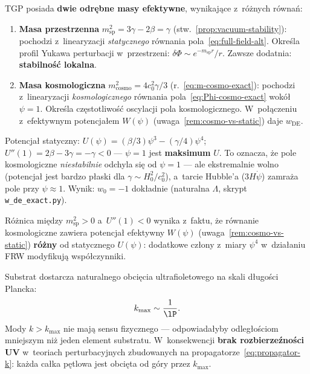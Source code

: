\begin{remark}\label{rem:two-masses}
TGP posiada \textbf{dwie odr\k{e}bne masy efektywne},
wynikaj\k{a}ce z~r\'o\.znych r\'owna\'n:

\begin{enumerate}[nosep]
  \item \textbf{Masa przestrzenna} $m_{\mathrm{sp}}^2 = 3\gamma - 2\beta = \gamma$
    (stw.~\ref{prop:vacuum-stability}): pochodzi z~linearyzacji
    \emph{statycznego} r\'ownania pola~\eqref{eq:full-field-alt}.
    Okre\'sla profil Yukawa perturbacji w~przestrzeni:
    $\delta\Phi \sim e^{-m_{\mathrm{sp}} r}/r$.
    Zawsze dodatnia: \textbf{stabilno\'s\'c lokalna}.

  \item \textbf{Masa kosmologiczna} $m_{\mathrm{cosmo}}^2 = 4c_0^2\gamma/3$
    (r.~\eqref{eq:m-cosmo-exact}): pochodzi z~linearyzacji
    \emph{kosmologicznego} r\'ownania pola~\eqref{eq:Phi-cosmo-exact}
    wok\'o\l{} $\psi = 1$. Okre\'sla cz\k{e}stotliwo\'s\'c
    oscylacji pola kosmologicznego. W~po\l{}\k{a}czeniu
    z~efektywnym potencja\l{}em $W(\psi)$
    (uwaga~\ref{rem:cosmo-vs-static}) daje $w_{\mathrm{DE}}$.
\end{enumerate}

\smallskip\noindent
Potencja\l{} statyczny: $U(\psi) = (\beta/3)\psi^3 - (\gamma/4)\psi^4$;
$U''(1) = 2\beta - 3\gamma = -\gamma < 0$ ---
$\psi = 1$ jest \textbf{maksimum} $U$.
To oznacza, \.ze pole kosmologiczne \emph{niestabilnie}
odchyla si\k{e} od $\psi = 1$ --- ale ekstremalnie wolno
(potencja\l{} jest bardzo p\l{}aski dla $\gamma \sim H_0^2/c_0^2$),
a~tarcie Hubble'a ($3H\dot\psi$) zamra\.za pole
przy $\psi \approx 1$. Wynik: $w_0 = -1$ dok\l{}adnie
(naturalna $\Lambda$, skrypt \texttt{w\_de\_exact.py}).

\smallskip\noindent
R\'o\.znica mi\k{e}dzy $m_{\mathrm{sp}}^2 > 0$ a~$U''(1) < 0$
wynika z~faktu, \.ze r\'ownanie kosmologiczne zawiera
potencja\l{} efektywny $W(\psi)$ (uwaga~\ref{rem:cosmo-vs-static})
\textbf{r\'o\.zny} od statycznego $U(\psi)$: dodatkowe
cz\l{}ony z~miary $\psi^4$ w~dzia\l{}aniu FRW
modyfikuj\k{a} wsp\'o\l{}czynniki.
\end{remark}

\begin{proposition}\label{prop:UV-cutoff}
Substrat dostarcza naturalnego obci\k{e}cia ultrafioletowego
na skali d\l{}ugo\'sci Plancka:
\begin{equation}\label{eq:kmax}
  k_{\max} \sim \frac{1}{\lP}.
\end{equation}
Mody $k > k_{\max}$ nie maj\k{a} sensu fizycznego ---
odpowiada\l{}yby odleg\l{}o\'sciom mniejszym ni\.z jeden element
substratu. W~konsekwencji \textbf{brak rozbierze\'zno\'sci UV}
w~teoriach perturbacyjnych zbudowanych na propagatorze~\eqref{eq:propagator-k}:
ka\.zda ca\l{}ka p\k{e}tlowa jest obci\k{e}ta od g\'ory przez
$k_{\max}$.
\end{proposition}

